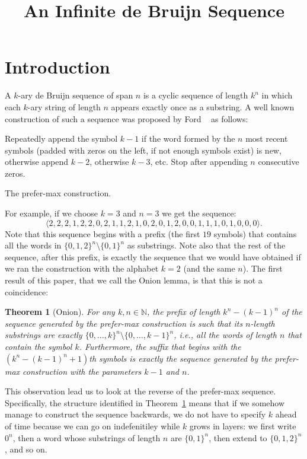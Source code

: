 \documentclass{article}
\title{An Infinite de Bruijn Sequence}
\author{}
\newtheorem{theorem}{Theorem}
\theoremstyle{definition}
\newcommand{\N}{{\mathbb{N}}}
\begin{document}
\maketitle

\section{Introduction}

A $k$-ary de Bruijn sequence of span $n$ is a cyclic sequence of length $k^n$ in which each $k$-ary string of length $n$ appears exactly once as
a substring. A well known construction of such a sequence was proposed by Ford ~\cite{Ford57} as follows:

\begin{algorithm}
Repeatedly append the symbol $k-1$ if the word formed by the $n$ most recent symbols (padded with zeros on the left, if not enough symbols exist) is new, otherwise append $k-2$, otherwise $k-3$, etc. Stop after appending $n$ consecutive zeros. 
\caption{The prefer-max construction.}
\end{algorithm}


For example, if we choose $k=3$ and $n=3$ we get the sequence:
$$\langle2,2,2,1,2,2,0,2,1,1,2,1,0,2,0,1,2,0,0,1,1,1,0,1,0,0,0\rangle.$$
Note that this sequence begins with a prefix (the first $19$ symbols) that contains all the words in $\{0,1,2\}^n \setminus \{0,1\}^n$ as substrings. Note also that the rest of the sequence, after this prefix, is exactly the sequence that we would have obtained if we ran the construction with the alphabet $k=2$ (and the same $n$). The first result of this paper, that we call the Onion lemma, is that this is not a coincidence:

\begin{theorem}[Onion]
	For any $k,n \in \N$, the prefix of length $k^n-(k-1)^n$ of the sequence generated by the prefer-max construction is such that its $n$-length substrings are exactly $\{0,\dots,k\}^n \setminus \{0,\dots,k-1\}^n$, i.e., all the words of length $n$ that contain the symbol $k$. Furthermore, the suffix that begins with the 
	$(k^n-(k-1)^n+1)$th symbols is exactly the sequence generated by the prefer-max construction with the parameters $k-1$ and $n$.
	\label{thm:onion}
\end{theorem}

This observation lead us to look at the reverse of the prefer-max sequence. Specifically, the structure identified in Theorem~\ref{thm:onion} means that if we somehow manage to construct the sequence backwards, we do not have to specify $k$ ahead of time because we can go on indefenitiley while $k$ grows in layers: we first write $0^n$, then a word whose substrings of length $n$ are $\{0,1\}^n$, then extend to $\{0,1,2\}^n$, and so on.
\end{document}
